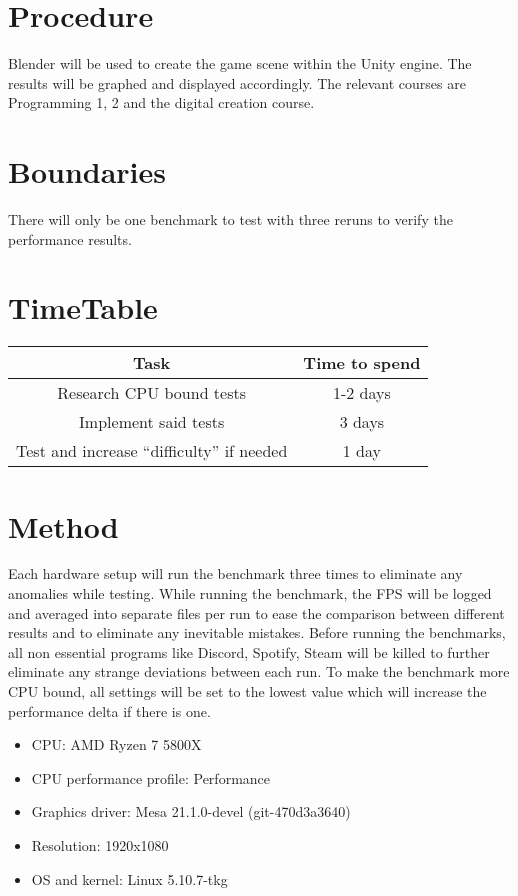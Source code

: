 \documentclass{article}
\begin{document}
\section{Procedure}
Blender will be used to create the game scene within the Unity engine. The results will be graphed and displayed accordingly. The relevant courses are Programming 1, 2 and the digital creation course.

\section {Boundaries}
There will only be one benchmark to test with three reruns to verify the performance results.

\section {TimeTable}
\begin{center}
\begin{tabular}{ |c|c| }
 \hline
    \textbf {Task} & \textbf {Time to spend} \\ [0.5ex]
 \hline\hline
    Research CPU bound tests & 1-2 days \\
    \hline
    Implement said tests & 3 days \\
    \hline
    Test and increase “difficulty” if needed & 1 day \\
 \hline
\end{tabular}
\end{center}


\section {Method}
Each hardware setup will run the benchmark three times to eliminate any anomalies while testing. While running the benchmark, the FPS will be logged and averaged into separate files per run to ease the comparison between different results and to eliminate any inevitable mistakes. Before running the benchmarks, all non essential programs like Discord, Spotify, Steam will be killed to further eliminate any strange deviations between each run. To make the benchmark more CPU bound, all settings will be set to the lowest value which will increase the performance delta if there is one.

\begin{itemize}
    \item CPU: AMD Ryzen 7 5800X
    \item CPU performance profile: Performance
    \item Graphics driver: Mesa 21.1.0-devel (git-470d3a3640)
    \item Resolution: 1920x1080
    \item OS and kernel: Linux 5.10.7-tkg
\end{itemize}




\end{document}
